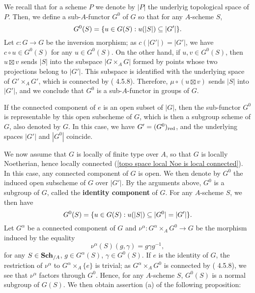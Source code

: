 We recall that for a scheme $P$ we denote by $|P|$ the underlyig topological space of $P$. Then, we define a sub-$A$-functor $G^0$ of $G$ so that for any $A$-scheme $S$,
\[G^0(S)=\{u\in G(S):u(|S|)\subseteq |G'|\}.\]
Let $c:G\to G$ be the inversion morphism; as $c(|G'|)=|G'|$, we have $c\circ u\in G^0(S)$ for any $u\in G^0(S)$. On the other hand, if $u,v\in G^0(S)$, then $u\boxtimes v$ sends $|S|$ into the subspace $|G\times_AG|$ formed by points whose two projections belong to $|G'|$. This subspace is identified with the underlying space of $G'\times_AG'$, which is connected by (\cite{EGA4-2} 4.5.8). Therefore, $\mu\circ(u\boxtimes v)$ sends $|S|$ into $|G'|$, and we conclude that $G^0$ is a sub-$A$-functor in groups of $G$.\par
If the connected component of $e$ is an open subset of $|G|$, then the sub-functor $G^0$ is representable by this open subscheme of $G$, which is then a subgroup scheme of $G$, also denoted by $G$. In this case, we have $G'=(G^0)_{\mathrm{red}}$, and the underlying spaces $|G'|$ and $|G^0|$ coincide.\par
We now assume that $G$ is locally of finite type over $A$, so that $G$ is locally Noetherian, hence locally connected (\cref{topo space local Noe is local connected}). In this case, any connected component of $G$ is open. We then denote by $G^0$ the induced open subscheme of $G$ over $|G'|$. By the arguments above, $G^0$ is a subgroup of $G$, called the \textbf{identity component} of $G$. For any $A$-scheme $S$, we then have
\[G^0(S)=\{u\in G(S):u(|S|)\subseteq |G^0|=|G'|\}.\]
Let $G^\alpha$ be a connected component of $G$ and $\nu^\alpha:G^\alpha\times_AG^0\to G$ be the morphism induced by the equality
\[\nu^\alpha(S)(g,\gamma)=g\gamma g^{-1},\]
for any $S\in\mathbf{Sch}_{/A}$, $g\in G^\alpha(S)$, $\gamma\in G^0(S)$. If $e$ is the identity of $G$, the restriction of $\nu^\alpha$ to $G^\alpha\times_A\{e\}$ is trivial; as $G^\alpha\times_AG^0$ is connected by (\cite{EGA4-2} 4.5.8), we see that $\nu^\alpha$ factors through $G^0$. Hence, for any $A$-scheme $S$, $G^0(S)$ is a normal subgroup of $G(S)$. We then obtain assertion (a) of the following proposition:

